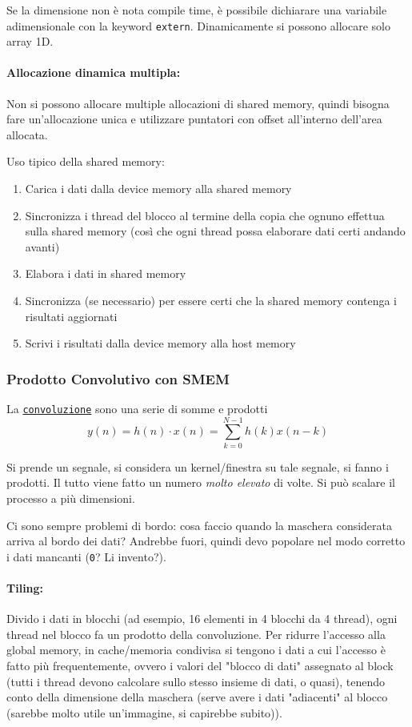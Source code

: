 Se la dimensione non è nota compile time, è possibile dichiarare una variabile adimensionale con la keyword \texttt{extern}. Dinamicamente si possono allocare solo array 1D.

\paragraph{Allocazione dinamica multipla:} Non si possono allocare multiple allocazioni di shared memory, quindi bisogna fare un'allocazione unica e utilizzare puntatori con offset all'interno dell'area allocata.

Uso tipico della shared memory:
\begin{enumerate}
	\item Carica i dati dalla device memory alla shared memory
	
	\item Sincronizza i thread del blocco al termine della copia che ognuno effettua sulla shared memory (così che ogni thread possa elaborare dati certi andando avanti)
	
	\item Elabora i dati in shared memory

	\item Sincronizza (se necessario) per essere certi che la shared memory contenga i risultati aggiornati
	
	\item Scrivi i risultati dalla device memory alla host memory
\end{enumerate}

\subsubsection{Prodotto Convolutivo con SMEM}
La \href{https://it.wikipedia.org/wiki/Convoluzione}{\texttt{convoluzione}} sono una serie di somme e prodotti
$$ y(n) = h(n) \cdot x(n) = \sum_{k=0}^{N-1} h(k) x(n-k) $$

Si prende un segnale, si considera un kernel/finestra su tale segnale, si fanno i prodotti. Il tutto viene fatto un numero \textit{molto elevato} di volte. Si può scalare il processo a più dimensioni.

Ci sono sempre problemi di bordo: cosa faccio quando la maschera considerata arriva al bordo dei dati? Andrebbe fuori, quindi devo popolare nel modo corretto i dati mancanti (\texttt{0}? Li invento?).

\paragraph{Tiling:} Divido i dati in blocchi (ad esempio, 16 elementi in 4 blocchi da 4 thread), ogni thread nel blocco fa un prodotto della convoluzione. Per ridurre l'accesso alla global memory, in cache/memoria condivisa si tengono i dati a cui l'accesso è fatto più frequentemente, ovvero i valori del "blocco di dati" assegnato al block (tutti i thread devono calcolare sullo stesso insieme di dati, o quasi), tenendo conto della dimensione della maschera (serve avere i dati "adiacenti" al blocco (sarebbe molto utile un'immagine, si capirebbe subito)).

